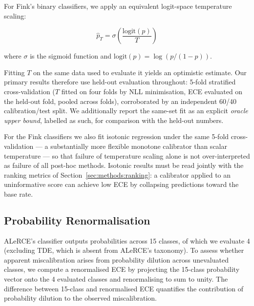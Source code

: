 For Fink's binary classifiers, we apply an equivalent logit-space 
temperature scaling:

\begin{equation}
\hat{p}_T = \sigma\!\left(\frac{\mathrm{logit}(p)}{T}\right)
\label{eq:tempscaling_binary}
\end{equation}

where $\sigma$ is the sigmoid function and $\mathrm{logit}(p) = 
\log(p / (1-p))$.

Fitting $T$ on the same data used to evaluate it yields an optimistic
estimate. Our primary results therefore use held-out evaluation
throughout: 5-fold stratified cross-validation ($T$ fitted on four
folds by NLL minimisation, ECE evaluated on the held-out fold, pooled
across folds), corroborated by an independent 60/40
calibration/test split. We additionally report the same-set fit as an
explicit \emph{oracle upper bound}, labelled as such, for comparison
with the held-out numbers.

For the Fink classifiers we also fit isotonic regression
\citep{Zadrozny2002} under the same 5-fold cross-validation — a
substantially more flexible monotone calibrator than scalar
temperature — so that failure of temperature scaling alone is not
over-interpreted as failure of all post-hoc methods. Isotonic results
must be read jointly with the ranking metrics of
Section~\ref{sec:methods:ranking}: a calibrator applied to an
uninformative score can achieve low ECE by collapsing predictions
toward the base rate.

\subsection{Probability Renormalisation}
\label{sec:methods:renorm}

ALeRCE's classifier outputs probabilities across 15 classes, of which 
we evaluate 4 (excluding TDE, which is absent from ALeRCE's taxonomy). 
To assess whether apparent miscalibration arises from probability 
dilution across unevaluated classes, we compute a renormalised ECE 
by projecting the 15-class probability vector onto the 4 evaluated 
classes and renormalising to sum to unity. The difference between 
15-class and renormalised ECE quantifies the contribution of probability 
dilution to the observed miscalibration.